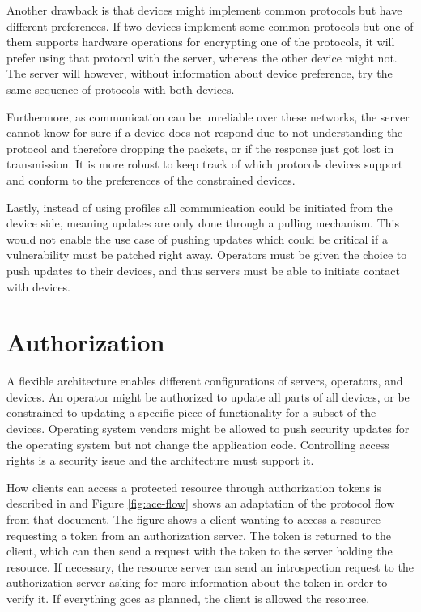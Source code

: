 \documentclass[0-thesis.tex]{subfiles}
\begin{document}
Another drawback is that devices might implement common protocols but have different
preferences. If two devices implement some common protocols but one of them supports
hardware operations for encrypting one of the protocols, it will prefer using that
protocol with the server, whereas the other device might not. The server will however,
without information about device preference, try the same sequence of protocols with both
devices.

Furthermore, as communication can be unreliable over these networks, the server
cannot know for sure if a device does not respond due to not understanding the protocol
and therefore dropping the packets, or if the response just got lost in transmission. It
is more robust to keep track of which protocols devices support and conform to the
preferences of the constrained devices.

Lastly, instead of using profiles all communication could be initiated from the device
side, meaning updates are only done through a pulling mechanism. This would not enable the
use case of pushing updates which could be critical if a vulnerability must be patched
right away. Operators must be given the choice to push updates to their devices, and thus
servers must be able to initiate contact with devices.

\section{Authorization}
\label{sec:authorization}
A flexible architecture enables different configurations of servers, operators, and
devices. An operator might be authorized to update all parts of all devices, or be
constrained to updating a specific piece of functionality for a subset of the devices.
Operating system vendors might be allowed to push security updates for the operating
system but not change the application code. Controlling access rights is a security issue
and the architecture must support it.

How clients can access a protected resource through authorization tokens is described in
\parencite{ace} and Figure \ref{fig:ace-flow} shows an adaptation of the protocol flow
from that document. The figure shows a client wanting to access a resource requesting a
token from an authorization server. The token is returned to the client, which can then
send a request with the token to the server holding the resource. If necessary, the
resource server can send an introspection request to the authorization server asking for
more information about the token in order to verify it. If everything goes as planned, the
client is allowed the resource.
\end{document}
